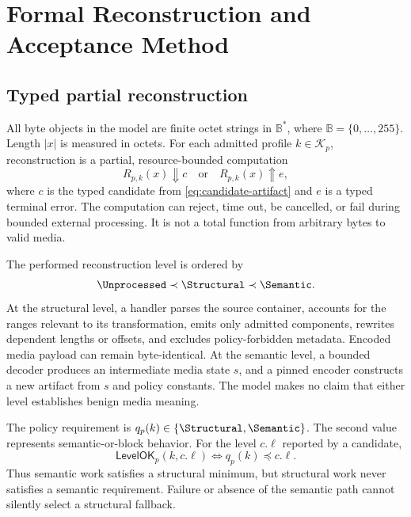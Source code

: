 \section{Formal Reconstruction and Acceptance Method}
\label{sec:formal-method}

\subsection{Typed partial reconstruction}

All byte objects in the model are finite octet strings in
$\mathbb{B}^{*}$, where $\mathbb{B}=\{0,\ldots,255\}$. Length $|x|$ is measured
in octets. For each admitted profile $k\in\mathcal{K}_p$, reconstruction is a
partial, resource-bounded computation
\begin{equation}
  R_{p,k}(x)\Downarrow c
  \quad\text{or}\quad
  R_{p,k}(x)\Uparrow e,
  \label{eq:reconstruction-relation}
\end{equation}
where $c$ is the typed candidate from \cref{eq:candidate-artifact} and $e$ is a
typed terminal error. The computation can reject, time out, be cancelled, or
fail during bounded external processing. It is not a total function from
arbitrary bytes to valid media.

The performed reconstruction level is ordered by
\begin{equation}
  \Unprocessed \prec \Structural \prec \Semantic.
  \label{eq:reconstruction-order}
\end{equation}
At the structural level, a handler parses the source container, accounts for
the ranges relevant to its transformation, emits only admitted components,
rewrites dependent lengths or offsets, and excludes policy-forbidden metadata.
Encoded media payload can remain byte-identical. At the semantic level, a
bounded decoder produces an intermediate media state $s$, and a pinned encoder
constructs a new artifact from $s$ and policy constants. The model makes no
claim that either level establishes benign media meaning.

The policy requirement is
$q_p(k)\in\{\Structural,\Semantic\}$. The second value represents
semantic-or-block behavior. For the level $c.\ell$ reported by a candidate,
\begin{equation}
  \mathsf{LevelOK}_p(k,c.\ell)
  \iff q_p(k)\preceq c.\ell.
  \label{eq:level-satisfaction}
\end{equation}
Thus semantic work satisfies a structural minimum, but structural work never
satisfies a semantic requirement. Failure or absence of the semantic path
cannot silently select a structural fallback.

